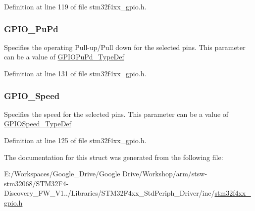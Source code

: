 Definition at line 119 of file stm32f4xx\-\_\-gpio.\-h.

\hypertarget{struct_g_p_i_o___init_type_def_aeb0168ffc465346d21f3120aec320b72}{
\subsubsection[{G\-P\-I\-O\-\_\-\-Pu\-Pd}]{ G\-P\-I\-O\-\_\-\-Pu\-Pd}}\label{struct_g_p_i_o___init_type_def_aeb0168ffc465346d21f3120aec320b72}
Specifies the operating Pull-\/up/\-Pull down for the selected pins. This parameter can be a value of \hyperlink{group___g_p_i_o_gafb7ecd99c44b4fd702d669304a36c2c8}{G\-P\-I\-O\-Pu\-Pd\-\_\-\-Type\-Def} 

Definition at line 131 of file stm32f4xx\-\_\-gpio.\-h.

\hypertarget{struct_g_p_i_o___init_type_def_a57b08335216f50618ebc080e4fbb0a80}{
\subsubsection[{G\-P\-I\-O\-\_\-\-Speed}]{ G\-P\-I\-O\-\_\-\-Speed}}\label{struct_g_p_i_o___init_type_def_a57b08335216f50618ebc080e4fbb0a80}
Specifies the speed for the selected pins. This parameter can be a value of \hyperlink{group___g_p_i_o_ga062ad92b67b4a1f301c161022cf3ba8e}{G\-P\-I\-O\-Speed\-\_\-\-Type\-Def} 

Definition at line 125 of file stm32f4xx\-\_\-gpio.\-h.



The documentation for this struct was generated from the following file\-:\begin{DoxyCompactItemize}
\item 
E\-:/\-Workspaces/\-Google\-\_\-\-Drive/\-Google Drive/\-Workshop/arm/stsw-\/stm32068/\-S\-T\-M32\-F4-\/\-Discovery\-\_\-\-F\-W\-\_\-\-V1../\-Libraries/\-S\-T\-M32\-F4xx\-\_\-\-Std\-Periph\-\_\-\-Driver/inc/\hyperlink{stm32f4xx__gpio_8h}{stm32f4xx\-\_\-gpio.\-h}\end{DoxyCompactItemize}
